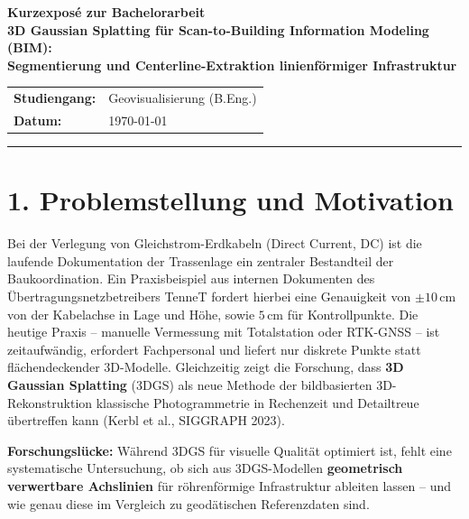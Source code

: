 \documentclass[11pt, a4paper]{article}
\begin{document}
\begin{center}
    {\large\bfseries Kurzexpos\'e zur Bachelorarbeit}\\[0.5em]
    {\normalsize\bfseries 3D Gaussian Splatting f\"ur Scan-to-Building Information Modeling (BIM):\\
        Segmentierung und Centerline-Extraktion linienf\"ormiger Infrastruktur}\\[0.8em]
    \small
    \begin{tabular}{ll}
        \textbf{Studiengang:} & Geovisualisierung (B.Eng.) \\
        \textbf{Datum:}       & \today                     \\
    \end{tabular}
\end{center}

\vspace{-0.5em}
\noindent\rule{\textwidth}{0.4pt}

\section{1. Problemstellung und Motivation}

Bei der Verlegung von Gleichstrom-Erdkabeln (Direct Current, DC) ist die laufende Dokumentation der Trassenlage ein zentraler Bestandteil der Baukoordination. Ein Praxisbeispiel aus internen Dokumenten des \"Ubertragungsnetzbetreibers TenneT fordert hierbei eine Genauigkeit von $\pm 10$\,cm von der Kabelachse in Lage und H\"ohe, sowie $5$\,cm f\"ur Kontrollpunkte. Die heutige Praxis -- manuelle Vermessung mit Totalstation oder RTK-GNSS -- ist zeitaufw\"andig, erfordert Fachpersonal und liefert nur diskrete Punkte statt fl\"achendeckender 3D-Modelle. Gleichzeitig zeigt die Forschung, dass \textbf{3D Gaussian Splatting} (3DGS) als neue Methode der bildbasierten 3D-Rekonstruktion klassische Photogrammetrie in Rechenzeit und Detailtreue \"ubertreffen kann (Kerbl et al., SIGGRAPH 2023).

\textbf{Forschungsl\"ucke:} W\"ahrend 3DGS f\"ur visuelle Qualit\"at optimiert ist, fehlt eine systematische Untersuchung, ob sich aus 3DGS-Modellen \textbf{geometrisch verwertbare Achslinien} f\"ur r\"ohrenf\"ormige Infrastruktur ableiten lassen -- und wie genau diese im Vergleich zu geod\"atischen Referenzdaten sind.
\end{document}

